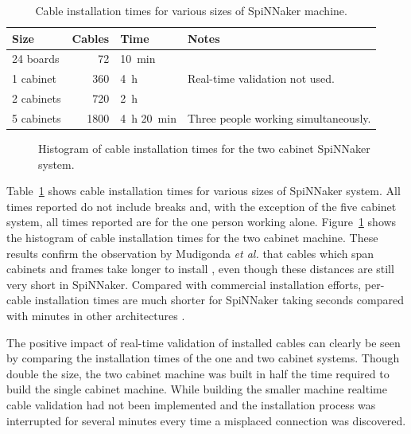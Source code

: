 			\begin{table}
				\center
				\begin{tabular}{lrll}
					\toprule
						Size & Cables & Time & Notes \\
					\midrule
						24 boards  & \num{72}   & \SI{10}{\minute} & \\
						1 cabinet  & \num{360}  & \SI{4}{\hour} &
							Real-time validation not used. \\
						2 cabinets & \num{720}  & \SI{2}{\hour} & \\
						5 cabinets & \num{1800} & \SI{4}{\hour} \SI{20}{\minute} &
							Three people working simultaneously. \\
					\bottomrule
				\end{tabular}
				
				\caption[Cable installation times for various SpiNNaker machines.]%
				{Cable installation times for various sizes of SpiNNaker
				machine.}
				\label{tab:install-time}
			\end{table}
			
			\begin{figure}
				
				\caption[Two-cabinet SpiNNaker cable installation times.]%
				{Histogram of cable installation times for the two cabinet
				SpiNNaker system.}
				\label{fig:install-histogram}
			\end{figure}
			
			Table~\ref{tab:install-time} shows cable installation times for various
			sizes of SpiNNaker system. All times reported do not include breaks and,
			with the exception of the five cabinet system, all times reported are for
			the one person working alone.  Figure~\ref{fig:install-histogram} shows
			the histogram of cable installation times for the two cabinet machine.
			These results confirm the observation by Mudigonda \emph{et al.} that
			cables which span cabinets and frames take longer to install
			\cite{mudigonda11}, even though these distances are still very short in
			SpiNNaker. Compared with commercial installation efforts, per-cable
			installation times are much shorter for SpiNNaker taking seconds compared
			with minutes in other architectures \cite{mudigonda11}.
			
			The positive impact of real-time validation of installed cables can
			clearly be seen by comparing the installation times of the one and two
			cabinet systems. Though double the size, the two cabinet machine was
			built in half the time required to build the single cabinet machine.
			While building the smaller machine realtime cable validation had not been
			implemented and the installation process was interrupted for several
			minutes every time a misplaced connection was discovered.
			
